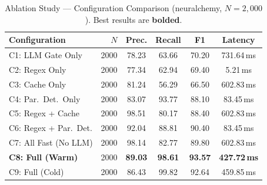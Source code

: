 \documentclass[conference]{IEEEtran}
\begin{document}
\begin{table}[t]
\centering
\caption{Ablation Study --- Configuration Comparison
(neuralchemy, $N{=}2{,}000$). Best results are \textbf{bolded}.}
\label{tab:ablation}
\scriptsize
\begin{tabular}{@{}lrcccc@{}}
\toprule
\textbf{Configuration}
    & \textbf{$N$} & \textbf{Prec.} & \textbf{Recall}
    & \textbf{F1} & \textbf{Latency} \\
\midrule
C1: LLM Gate Only
    & 2000 & 78.23 & 63.66 & 70.20 & 731.64\,ms \\
C2: Regex Only
    & 2000 & 77.34 & 62.94 & 69.40 & 5.21\,ms \\
C3: Cache Only
    & 2000 & 81.24 & 56.29 & 66.50 & 602.83\,ms \\
C4: Par.\ Det.\ Only
    & 2000 & 83.07 & 93.77 & 88.10 & 83.45\,ms \\
C5: Regex + Cache
    & 2000 & 98.51 & 80.17 & 88.40 & 602.83\,ms \\
C6: Regex + Par.\ Det.
    & 2000 & 92.04 & 88.81 & 90.40 & 83.45\,ms \\
C7: All Fast (No LLM)
    & 2000 & 98.14 & 82.77 & 89.80 & 602.83\,ms \\
\textbf{C8: Full (Warm)}
    & 2000 & \textbf{89.03} & \textbf{98.61} & \textbf{93.57} & \textbf{427.72\,ms} \\
C9: Full (Cold)
    & 2000 & 86.43 & 99.82 & 92.64 & 459.85\,ms \\
\bottomrule
\end{tabular}
\end{table}
\end{document}

